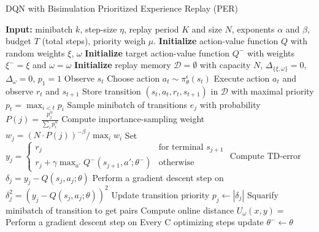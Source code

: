 \begin{algorithm}
\caption{DQN with Bisimulation Prioritized Experience Replay (PER)}
\label{algorithm:dqn_per}
\begin{algorithmic}[1]
\State \textbf{Input:} minibatch $k$, step-size $\eta$, replay period $K$ and size $N$, exponents $\alpha$ and $\beta$, budget $T$ (total steps), priority weigh $\mu$.
\State \textbf{Initialize} action-value function $Q$ with random weights $\xi$, $\omega$
\State \textbf{Initialize} target action-value function $Q^-$ with weights $\xi^- = \xi$ and $\omega = \omega$
\State \textbf{Initialize} replay memory $\mathcal{D} = \emptyset$ with capacity $N$, $\Delta_{\{\xi, \omega\}} = 0$, $\Delta_\omega = 0$, $p_1 = 1$
    \State Observe $s_t$
    \State Choose action $a_t \sim \pi^\epsilon_\theta(s_t)$
    \State Execute action $a_t$ and observe $r_t$ and $s_{t+1}$
    \State Store transition $(s_t, a_t, r_t, s_{t+1})$ in $\mathcal{D}$ with maximal priority $p_t = \max_{i < t} p_i$
        \State Sample minibatch of transitions $e_j$ with probability $P(j) = \frac{p_j^\alpha}{\sum_i p_i^\alpha}$    
        \State Compute importance-sampling weight $w_j = \left( N \cdot P(j) \right)^{-\beta} / \max_i w_i$
        \State Set $y_j = 
        \begin{cases} 
            r_j & \text{for terminal } s_{j+1}\\
            r_j + \gamma \max_{a'} Q^-(s_{j+1}, a'; \theta^-) & \text{otherwise}
        \end{cases}$
        \State Compute TD-error $\delta_j = y_j - Q(s_{j}, a_{j}; \theta)$
        \State Perform a gradient descent step on $ \delta_j^2 = (y_j - Q(s_{j}, a_{j}; \theta))^2$
        \State Update transition priority $p_j \leftarrow |\delta_j|$
        \State Squarify minibatch of transition to get pairs 
        \State Compute online distance $U_\omega(x, y) = $
        \State Perform a gradient descent step on %
        \State Every C optimizing steps update $\theta^- \leftarrow \theta$

        

    \EndIf
\EndFor
\end{algorithmic}
\end{algorithm}

